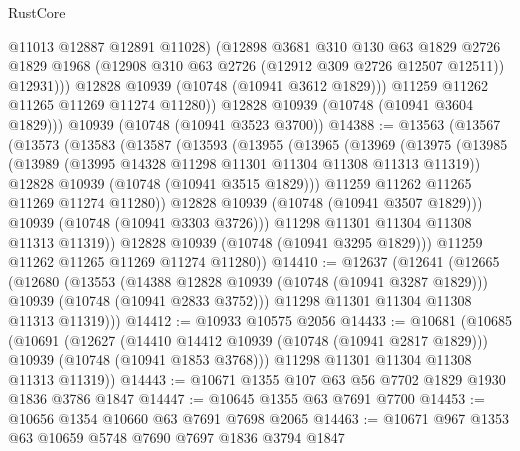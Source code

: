 \begin{lexlean}{RustCore}
\begin{coremodule}
                  @11013
                  @12887
                  @12891
                  @11028)
                (@12898
                  @3681
                  @310
                  @130
                  @63
                  @1829
                  @2726
                  @1829
                  @1968
                  (@12908 @310 @63 @2726 (@12912 @309 @2726 @12507 @12511))
                  @12931)))
            @12828
            @10939
            (@10748 (@10941 @3612 @1829)))
          @11259
          @11262
          @11265
          @11269
          @11274
          @11280))
      @12828
      @10939
      (@10748 (@10941 @3604 @1829)))
    @10939
    (@10748 (@10941 @3523 @3700))
@14388 := @13563
    (@13567
      (@13573
        (@13583
          (@13587
            (@13593
              (@13955
                (@13965
                  (@13969
                    (@13975
                      (@13985
                        (@13989 (@13995 @14328 @11298 @11301 @11304 @11308 @11313 @11319))
                        @12828
                        @10939
                        (@10748 (@10941 @3515 @1829)))
                      @11259
                      @11262
                      @11265
                      @11269
                      @11274
                      @11280))
                  @12828
                  @10939
                  (@10748 (@10941 @3507 @1829)))
                @10939
                (@10748 (@10941 @3303 @3726)))
              @11298
              @11301
              @11304
              @11308
              @11313
              @11319))
          @12828
          @10939
          (@10748 (@10941 @3295 @1829)))
        @11259
        @11262
        @11265
        @11269
        @11274
        @11280))
@14410 := @12637
    (@12641
      (@12665
        (@12680
          (@13553
            (@14388 @12828 @10939 (@10748 (@10941 @3287 @1829)))
            @10939
            (@10748 (@10941 @2833 @3752)))
          @11298
          @11301
          @11304
          @11308
          @11313
          @11319)))
@14412 := @10933 @10575 @2056
@14433 := @10681
    (@10685
      (@10691
        (@12627
          (@14410 @14412 @10939 (@10748 (@10941 @2817 @1829)))
          @10939
          (@10748 (@10941 @1853 @3768)))
        @11298
        @11301
        @11304
        @11308
        @11313
        @11319))
@14443 := @10671 @1355 @107 @63 @56 @7702 @1829 @1930 @1836 @3786 @1847
@14447 := @10645 @1355 @63 @7691 @7700
@14453 := @10656 @1354 @10660 @63 @7691 @7698 @2065
@14463 := @10671 @967 @1353 @63 @10659 @5748 @7690 @7697 @1836 @3794 @1847

\end{coremodule}
\end{lexlean}
